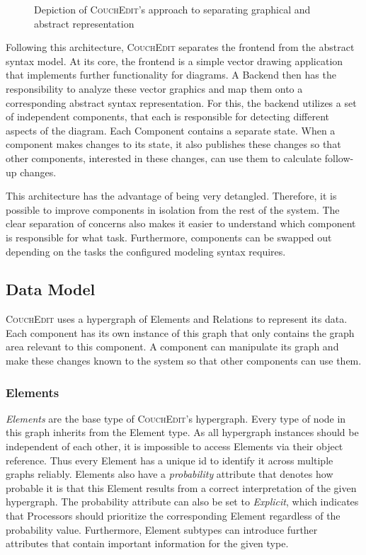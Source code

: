 \begin{figure}
  \centering
  
  \caption{Depiction of \textsc{CouchEdit}'s approach to separating graphical and abstract representation}
  \label{fig:transmm}
  \end{figure}

Following this architecture, \textsc{CouchEdit} separates the frontend from the  abstract syntax model. At its core, the frontend is a simple vector drawing application that implements further functionality for diagrams. A Backend then has the responsibility to analyze these vector graphics and map them onto a corresponding abstract syntax representation. For this, the backend utilizes a set of independent components, that each is responsible for detecting different aspects of the diagram. Each Component contains a separate state. When a component makes changes to its state, it also publishes these changes so that other components, interested in these changes, can use them to calculate follow-up changes.  

This architecture has the advantage of being very detangled. Therefore, it is possible to improve components in isolation from the rest of the system. The clear separation of concerns also makes it easier to understand which component is responsible for what task. Furthermore, components can be swapped out depending on the tasks the configured modeling syntax requires.



\subsection{Data Model}
\textsc{CouchEdit} uses a hypergraph of Elements and Relations to represent its data. Each component has its own instance of this graph that only contains the graph area relevant to this component. A component can manipulate its graph and make these changes known to the system so that other components can use them.


\subsubsection{Elements}
\emph{Elements} are the base type of \textsc{CouchEdit}'s hypergraph. Every type of node in this graph inherits from the Element type. As all hypergraph instances should be independent of each other, it is impossible to access Elements via their object reference. Thus every Element has a unique id to identify it across multiple graphs reliably. Elements also have a \emph{probability} attribute that denotes how probable it is that this Element results from a correct interpretation of the given hypergraph. The probability attribute can also be set to \emph{Explicit}, which indicates that Processors should prioritize the corresponding Element regardless of the probability value. Furthermore, Element subtypes can introduce further attributes that contain important information for the given type.


